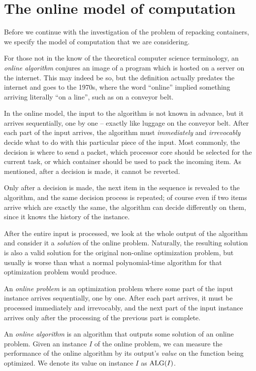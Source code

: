 \section{The online model of computation}

Before we continue with the investigation of the problem of repacking
containers, we specify the model of computation that we are
considering.

For those not in the know of the theoretical computer science
terminology, an \textit{online algorithm} conjures an image of a
program which is hosted on a server on the internet. This may indeed
be so, but the definition actually predates the internet and goes to
the 1970s, where the word ``online'' implied something arriving
literally ``on a line'', such as on a conveyor belt.

In the online model, the input to the algorithm is not known in
advance, but it arrives sequentially, one by one -- exactly like
luggage on the conveyor belt. After each part of the input arrives,
the algorithm must \textit{immediately} and \textit{irrevocably}
decide what to do with this particular piece of the input. Most
commonly, the decision is where to send a packet, which processor core
should be selected for the current task, or which container should be
used to pack the incoming item. As mentioned, after a decision is
made, it cannot be reverted. 

Only after a decision is made, the next item in the sequence is
revealed to the algorithm, and the same decision process is repeated;
of course even if two items arrive which are exactly the same, the
algorithm can decide differently on them, since it knows the history
of the instance.

After the entire input is processed, we look at the whole output of
the algorithm and consider it a \emph{solution} of the online problem.
Naturally, the resulting solution is also a valid solution for the
original non-online optimization problem, but usually is worse than
what a normal polynomial-time algorithm for that optimization problem
would produce.

\begin{dfn}
An \emph{online problem} is an optimization problem where some part of
the input instance arrives sequentially, one by one. After each part
arrives, it must be processed immediately and irrevocably, and the
next part of the input instance arrives only after the processing of
the previous part is complete.

An \emph{online algorithm} is an algorithm that outputs some solution
of an online problem. Given an instance $I$ of the online problem, we
can measure the performance of the online algorithm by its output's
\emph{value} on the function being optimized. We denote its value on
instance $I$ as $\mathrm{ALG}(I)$.
\end{dfn}

